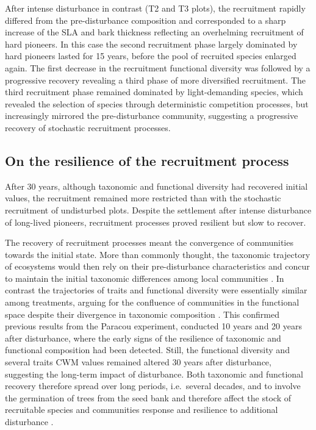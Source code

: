 \documentclass[fleqn,10pt]{ArtEcoFoG} %
\begin{document}
After intense disturbance in contrast (T2 and T3 plots), the recruitment
rapidly differed from the pre-disturbance composition and corresponded
to a sharp increase of the SLA and bark thickness reflecting an
overhelming recruitment of hard pioneers. In this case the second
recruitment phase largely dominated by hard pioneers lasted for 15
years, before the pool of recruited species enlarged again. The first
decrease in the recruitment functional diversity was followed by a
progressive recovery revealing a third phase of more diversified
recruitment. The third recruitment phase remained dominated by
light-demanding species, which revealed the selection of species through
deterministic competition processes, but increasingly mirrored the
pre-disturbance community, suggesting a progressive recovery of
stochastic recruitment processes.

\subsection{On the resilience of the recruitment
process}\label{on-the-resilience-of-the-recruitment-process}

After 30 years, although taxonomic and functional diversity had
recovered initial values, the recruitment remained more restricted than
with the stochastic recruitment of undisturbed plots. Despite the
settlement after intense disturbance of long-lived pioneers, recruitment
processes proved resilient but slow to recover.

The recovery of recruitment processes meant the convergence of
communities towards the initial state. More than commonly thought, the
taxonomic trajectory of ecosystems would then rely on their
pre-disturbance characteristics and concur to maintain the initial
taxonomic differences among local communities \citep{Anderson2007}. In
contrast the trajectories of traits and functional diversity were
essentially similar among treatments, arguing for the confluence of
communities in the functional space despite their divergence in
taxonomic composition \citep{Fukami2005}. This confirmed previous
results from the Paracou experiment, conducted 10 years
\citep{Molino2001} and 20 years \citep{Baraloto2012a} after disturbance,
where the early signs of the resilience of taxonomic and functional
composition had been detected. Still, the functional diversity and
several traits CWM values remained altered 30 years after disturbance,
suggesting the long-term impact of disturbance. Both taxonomic and
functional recovery therefore spread over long periods, i.e.~several
decades, and to involve the germination of trees from the seed bank and
therefore affect the stock of recruitable species and communities
response and resilience to additional disturbance \citep{Norden2009}.
\end{document}
